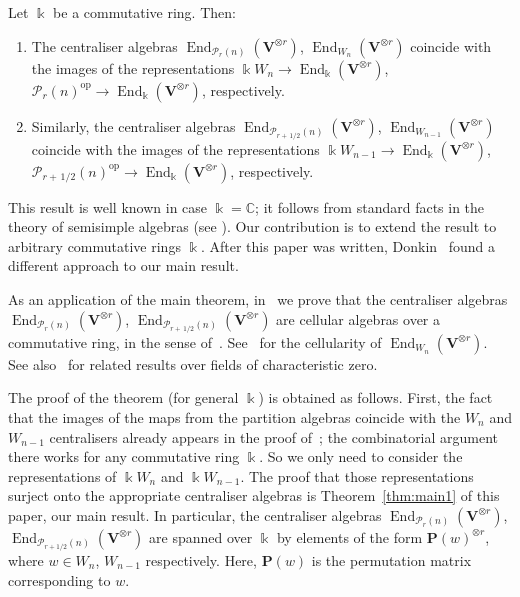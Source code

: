\documentclass[ALCO,ThmDefs,Unicode,epreuves]{cedram}
\DeclareMathOperator{\End}{End}
\DeclareMathOperator{\op}{op}
\newcommand{\C}{\mathbb{C}}
\newcommand{\Ptn}{\mathcal{P}}
\newcommand{\bP}{\mathbf{P}}
\newcommand{\V}{\mathbf{V}} %
\newcommand{\half}{\, 1/2} %
\begin{document}
\begin{theo*}
 Let $\Bbbk$ be a commutative ring. Then:
 \begin{enumerate}[label=(\alph*)]
 \item\label{theo*_a} The centraliser algebras $\End_{\Ptn_r(n)}(\V^{\otimes r})$,
 $\End_{W_n}(\V^{\otimes r})$ coincide with the images of the
 representations $\Bbbk W_n \to \End_\Bbbk(\V^{\otimes r})$,
 $\Ptn_r(n)^{\op} \to \End_\Bbbk(\V^{\otimes r})$, respectively.
 
 \item\label{theo*_b}  Similarly, the centraliser algebras
 $\End_{\Ptn_{r+\half}(n)}(\V^{\otimes r})$,
 $\End_{W_{n-1}}(\V^{\otimes r})$ coincide with the images of the
 representations $\Bbbk W_{n-1} \to \End_\Bbbk(\V^{\otimes r})$,
 $\Ptn_{r+\half}(n)^{\op} \to \End_\Bbbk(\V^{\otimes r})$,
 respectively.
 \end{enumerate}
\end{theo*}

This result is well known in case $\Bbbk=\C$; it follows from standard
facts in the theory of semisimple algebras (see \eg \cite[Thms~5.4,
 3.6]{HR-2005}). Our contribution is to extend the result to
arbitrary commutative rings $\Bbbk$. After this paper was written,
Donkin~\cite{Donkin:Double} found a different approach to our main
result.

As an application of the main theorem, in~\cite[Cor.~7.6]{BDM:second}
we prove that the centraliser algebras $\End_{\Ptn_r(n)}(\V^{\otimes
 r})$, $\End_{\Ptn_{r+\half}(n)}(\V^{\otimes r})$ are cellular
algebras over a commutative ring, in the sense of~\cite{Graham-Lehrer}. See~\cite{Donkin:Cellularity} for the
cellularity of $\End_{W_n}(\V^{\otimes r})$. See also~\cite{BH:2,
 BH:1} for related results over fields of characteristic zero.

The proof of the theorem (for general $\Bbbk$) is obtained as
follows. First, the fact that the images of the maps from the
partition algebras coincide with the $W_n$ and $W_{n-1}$ centralisers
already appears in the proof of~\cite[Thm.~3.6]{HR-2005}; the
combinatorial argument there works for any commutative ring
$\Bbbk$. So we only need to consider the representations of $\Bbbk
W_n$ and $\Bbbk W_{n-1}$. The proof that those representations surject
onto the appropriate centraliser algebras is Theorem~\ref{thm:main1}
of this paper, our main result. In particular, the centraliser
algebras $\End_{\Ptn_r(n)}(\V^{\otimes r})$,
$\End_{\Ptn_{r+1/2}(n)}(\V^{\otimes r})$ are spanned over $\Bbbk$ by
elements of the form $\bP(w)^{\otimes r}$, where $w \in W_n$,
$W_{n-1}$ respectively. Here, $\bP(w)$ is the permutation matrix
corresponding to $w$.
\end{document}
